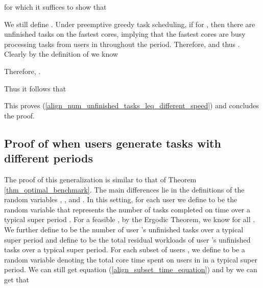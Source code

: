 \documentclass[prodmode,acmtompecs]{acmsmall}
\newcommand{\myComments}[1]{}
\newif\iftompecsextended
\newcommand{\tompecsextendedStart}{\iftompecsextended  \myComments{TOMPECS extended version: }}
\newcommand{\commentEnd}{\myComments{End}}
\begin{document}
for which it suffices to show that


We still define . Under preemptive greedy task scheduling, if  for , then there are  unfinished tasks on the  fastest cores, implying that the  fastest cores are busy processing tasks from users in  throughout the period. 
Therefore,  and thus . Clearly by the definition of  we know 

Therefore, . 

Thus it follows that


This proves (\ref{align_num_unfinished_tasks_leq_different_speed}) and concludes the proof. 
\commentEnd\fi

\tompecsextendedStart
\subsection{Proof of Corollary \ref{corollary_gamma1_diff_speed_nonpre}}
\label{appendix_pf_gamma1_diff_speed_nonpre}
The proof is similar as that of Corollary \ref{corollary_gamma1_diff_speed_pre}. But this time, instead of showing (\ref{align_wasted_smaller_than_fraction_of_total_different_speed}), we shall show

for which it suffices to show that


This is true because, if  for , then there are  unfinished tasks, implying that there are  cores busy processing tasks from users in  throughout the period. 
Thus, . 

Thus it follows that

which proves (\ref{align_num_unfinished_tasks_leq_different_speed_nonpreemptive}). 
\commentEnd\fi

\tompecsextendedStart
\subsection{Proof of  when users generate tasks with different periods}
\label{appendix_pf_R_OB_diff_periods}
The proof of this generalization is similar to that of Theorem \ref{thm_optimal_benchmark}. The main differences lie in the definitions of the random variables , ,  and . 
In this setting, for each user  we define  to be the random variable that represents the number of tasks completed on time over a typical super period . 
For a feasible , by the Ergodic Theorem, we know  for all . 
We further define  to be the number of user 's unfinished tasks over a typical super period and define  to be the total residual workloads of user 's unfinished tasks over a typical super period. For each subset of users , we define  to be a random variable denoting the total core time spent on users in  in a typical super period. We can still get equation (\ref{align_subset_time_equation}) and by  we can get that 
\end{document}
